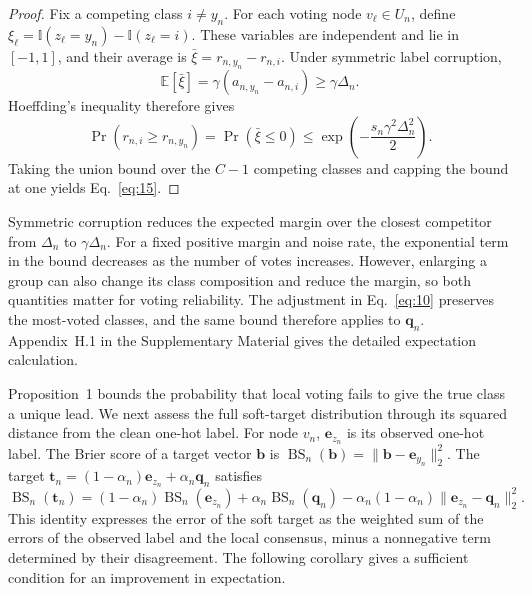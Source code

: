 \documentclass[a4paper,fleqn]{cas-sc}
\theoremstyle{definition}
\theoremstyle{plain}
\begin{document}
\begin{proof}
\renewcommand{\qedsymbol}{}
Fix a competing class \(i\ne y_n\). For each voting node \(v_\ell\in U_n\), define \(\xi_\ell=\mathbb I(z_\ell=y_n)-\mathbb I(z_\ell=i)\). These variables are independent and lie in \([-1,1]\), and their average is \(\bar\xi=r_{n,y_n}-r_{n,i}\). Under symmetric label corruption,
\[
\mathbb E[\bar\xi]=\gamma(a_{n,y_n}-a_{n,i})\geq\gamma\Delta_n.
\]
Hoeffding's inequality \cite{hoeffding1963} therefore gives
\[
\Pr\!\left(r_{n,i}\geq r_{n,y_n}\right)=\Pr(\bar\xi\leq0)
\leq\exp\!\left(-\frac{s_n\gamma^2\Delta_n^2}{2}\right).
\]
Taking the union bound over the \(C-1\) competing classes and capping the bound at one yields Eq.~\eqref{eq:15}.
\end{proof}

Symmetric corruption reduces the expected margin over the closest competitor from \(\Delta_n\) to \(\gamma\Delta_n\). For a fixed positive margin and noise rate, the exponential term in the bound decreases as the number of votes increases. However, enlarging a group can also change its class composition and reduce the margin, so both quantities matter for voting reliability. The adjustment in Eq.~\eqref{eq:10} preserves the most-voted classes, and the same bound therefore applies to \(\mathbf q_n\). Appendix~H.1 in the Supplementary Material gives the detailed expectation calculation.

Proposition~1 bounds the probability that local voting fails to give the true class a unique lead. We next assess the full soft-target distribution through its squared distance from the clean one-hot label. For node \(v_n\), \(\mathbf e_{z_n}\) is its observed one-hot label. The Brier score of a target vector \(\mathbf b\) is \(\operatorname{BS}_n(\mathbf b)=\|\mathbf b-\mathbf e_{y_n}\|_2^2\). The target \(\mathbf t_n=(1-\alpha_n)\mathbf e_{z_n}+\alpha_n\mathbf q_n\) satisfies
\begin{equation}\label{eq:16}
\operatorname{BS}_n(\mathbf t_n)=(1-\alpha_n)\operatorname{BS}_n(\mathbf e_{z_n})+\alpha_n\operatorname{BS}_n(\mathbf q_n)-\alpha_n(1-\alpha_n)\|\mathbf e_{z_n}-\mathbf q_n\|_2^2.
\end{equation}
This identity expresses the error of the soft target as the weighted sum of the errors of the observed label and the local consensus, minus a nonnegative term determined by their disagreement. The following corollary gives a sufficient condition for an improvement in expectation.
\end{document}
